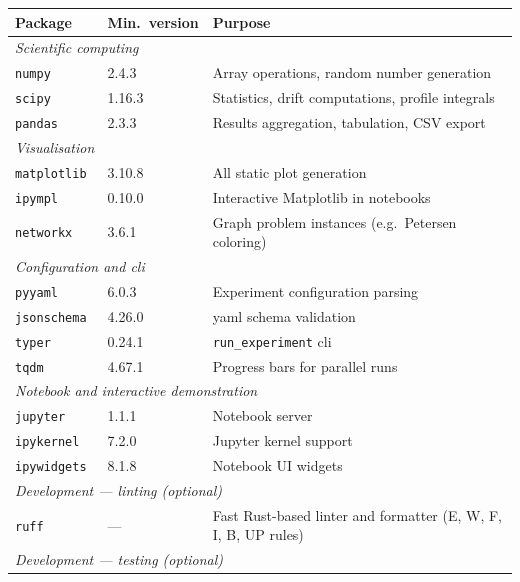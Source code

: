 \small
\begin{longtable}{p{3cm}p{3cm}p{8cm}}
  \hline
  \textbf{Package} & \textbf{Min.\ version} & \textbf{Purpose} \\
  \hline
  \multicolumn{3}{l}{\textit{Scientific computing}} \\
  \hline
  \texttt{numpy}~\cite{numpy}      & 2.4.3  & Array operations,
  random number generation \\
  \texttt{scipy}~\cite{scipy}      & 1.16.3 & Statistics, drift
  computations, profile integrals \\
  \texttt{pandas}~\cite{pandas}    & 2.3.3  & Results aggregation,
  tabulation, CSV export \\
  \hline
  \multicolumn{3}{l}{\textit{Visualisation}} \\
  \hline
  \texttt{matplotlib}~\cite{matplotlib} & 3.10.8 & All static plot
  generation \\
  \texttt{ipympl}                       & 0.10.0 & Interactive
  Matplotlib in notebooks \\
  \texttt{networkx}~\cite{networkx}& 3.6.1  & Graph problem
  instances (e.g.\ Petersen coloring) \\
  \hline
  \multicolumn{3}{l}{\textit{Configuration and \acrshort{cli}}} \\
  \hline
  \texttt{pyyaml}~\cite{pyyaml}      & 6.0.3  & Experiment
  configuration parsing \\
  \texttt{jsonschema}~\cite{jsonschema}  & 4.26.0 & \acrshort{yaml}
  schema validation \\
  \texttt{typer}~\cite{typer}       & 0.24.1 &
  \texttt{run\_experiment} \acrshort{cli} \\
  \texttt{tqdm}~\cite{tqdm}        & 4.67.1 & Progress bars for
  parallel runs \\
  \hline
  \multicolumn{3}{l}{\textit{Notebook and interactive demonstration}} \\
  \hline
  \texttt{jupyter}~\cite{jupyter}     & 1.1.1  & Notebook server \\
  \texttt{ipykernel}   & 7.2.0  & Jupyter kernel support \\
  \texttt{ipywidgets}  & 8.1.8  & Notebook UI widgets \\
  \hline
  \multicolumn{3}{l}{\textit{Development --- linting (optional)}} \\
  \hline
  \texttt{ruff}~\cite{ruff} & --- & Fast Rust-based linter and
  formatter (E, W, F, I, B, UP rules) \\
  \hline
  \multicolumn{3}{l}{\textit{Development --- testing (optional)}} \\

\end{longtable}
